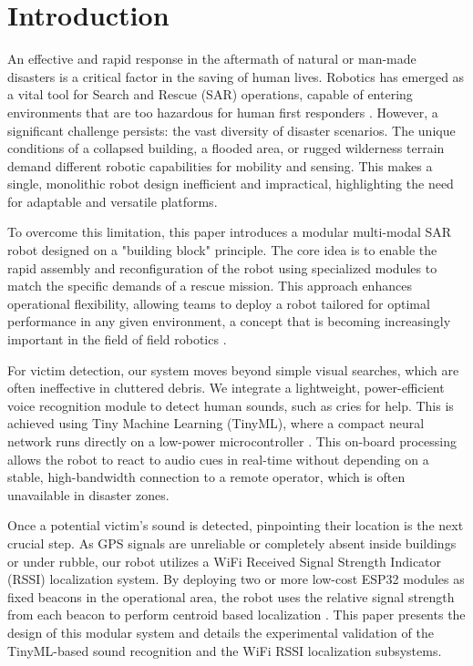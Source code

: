 \section{Introduction}
An effective and rapid response in the aftermath of natural or man-made disasters is a critical factor in the saving of human lives. Robotics has emerged as a vital tool for Search and Rescue (SAR) operations, capable of entering environments that are too hazardous for human first responders \cite{SARRobot}. However, a significant challenge persists: the vast diversity of disaster scenarios. The unique conditions of a collapsed building, a flooded area, or rugged wilderness terrain demand different robotic capabilities for mobility and sensing. This makes a single, monolithic robot design inefficient and impractical, highlighting the need for adaptable and versatile platforms.

To overcome this limitation, this paper introduces a modular multi-modal SAR robot designed on a "building block" principle. The core idea is to enable the rapid assembly and reconfiguration of the robot using specialized modules to match the specific demands of a rescue mission. This approach enhances operational flexibility, allowing teams to deploy a robot tailored for optimal performance in any given environment, a concept that is becoming increasingly important in the field of field robotics \cite{ModularRobotic}.

For victim detection, our system moves beyond simple visual searches, which are often ineffective in cluttered debris. We integrate a lightweight, power-efficient voice recognition module to detect human sounds, such as cries for help. This is achieved using Tiny Machine Learning (TinyML), where a compact neural network runs directly on a low-power microcontroller \cite{TinyML}. This on-board processing allows the robot to react to audio cues in real-time without depending on a stable, high-bandwidth connection to a remote operator, which is often unavailable in disaster zones.

Once a potential victim's sound is detected, pinpointing their location is the next crucial step. As GPS signals are unreliable or completely absent inside buildings or under rubble, our robot utilizes a WiFi Received Signal Strength Indicator (RSSI) localization system. By deploying two or more low-cost ESP32 modules as fixed beacons in the operational area, the robot uses the relative signal strength from each beacon to perform centroid based localization \cite{WSNCentroid}. This paper presents the design of this modular system and details the experimental validation of the TinyML-based sound recognition and the WiFi RSSI localization subsystems.
